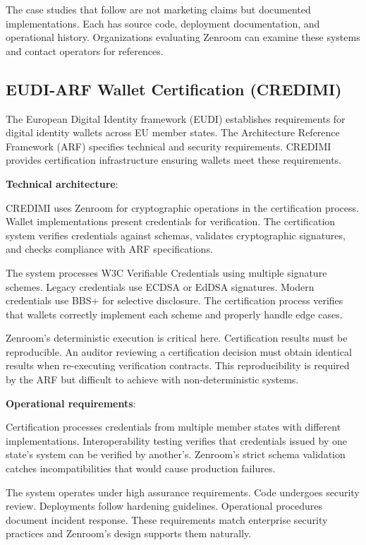 The case studies that follow are not marketing claims but documented
implementations. Each has source code, deployment documentation, and
operational history. Organizations evaluating Zenroom can examine
these systems and contact operators for references.

\subsection{EUDI-ARF Wallet Certification (CREDIMI)}

The European Digital Identity framework (EUDI) establishes
requirements for digital identity wallets across EU member states. The
Architecture Reference Framework (ARF) specifies technical and
security requirements. CREDIMI provides certification infrastructure
ensuring wallets meet these requirements.

\textbf{Technical architecture}:

CREDIMI uses Zenroom for cryptographic operations in the certification
process. Wallet implementations present credentials for
verification. The certification system verifies credentials against
schemas, validates cryptographic signatures, and checks compliance
with ARF specifications.

The system processes W3C Verifiable Credentials using multiple
signature schemes. Legacy credentials use ECDSA or EdDSA
signatures. Modern credentials use BBS+ for selective disclosure. The
certification process verifies that wallets correctly implement each
scheme and properly handle edge cases.

Zenroom's deterministic execution is critical here. Certification
results must be reproducible. An auditor reviewing a certification
decision must obtain identical results when re-executing verification
contracts. This reproducibility is required by the ARF but difficult
to achieve with non-deterministic systems.

\textbf{Operational requirements}:

Certification processes credentials from multiple member states with
different implementations. Interoperability testing verifies that
credentials issued by one state's system can be verified by
another's. Zenroom's strict schema validation catches
incompatibilities that would cause production failures.

The system operates under high assurance requirements. Code undergoes
security review. Deployments follow hardening guidelines. Operational
procedures document incident response. These requirements match
enterprise security practices and Zenroom's design supports them
naturally.

